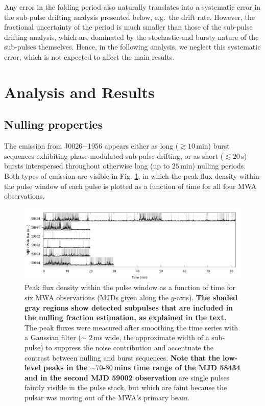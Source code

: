 \documentclass[linenumbers]{aastex631}
\newcommand{\psr}{J0026$-$1956}
\begin{document}
Any error in the folding period also naturally translates into a systematic error in the sub-pulse drifting analysis presented below, e.g.\ the drift rate.
However, the fractional uncertainty of the period is much smaller than those of the sub-pulse drifting analysis, which are dominated by the stochastic and bursty nature of the sub-pulses themselves.
Hence, in the following analysis, we neglect this systematic error, which is not expected to affect the main results.

\section{Analysis and Results}
\label{sec:analysis}

\subsection{Nulling properties}
\label{sec:nulling}

The emission from \psr{} appears either as long ($\gtrsim 10\,$min) burst sequences exhibiting phase-modulated sub-pulse drifting, or as short ($\lesssim 20\,$s) bursts interspersed throughout otherwise long (up to $25\,$min) nulling periods.
Both types of emission are visible in Fig. \ref{fig:maxima}, in which the peak flux density within the pulse window of each pulse is plotted as a function of time for all four MWA observations.

\begin{figure}[t]
    \includegraphics[width=\textwidth]{maxima_plot.png}
    \caption{Peak flux density within the pulse window as a function of time for six MWA observations (MJDs given along the $y$-axis). {\bf The shaded gray regions show detected subpulses that are included in the nulling fraction estimation, as explained in the text.} The peak fluxes were measured after smoothing the time series with a Gaussian filter ($\sim$ 2\,ms wide, the approximate width of a sub-pulse) to suppress the noise contribution and accentuate the contrast between nulling and burst sequences. {\bf Note that the low-level peaks in the $\sim70$-$80\,$mins time range of the MJD 58434 and in the second MJD 59002 observation} are single pulses faintly visible in the pulse stack, but which are faint because the pulsar was moving out of the MWA's primary beam.}
    \label{fig:maxima}
\end{figure}
\end{document}
